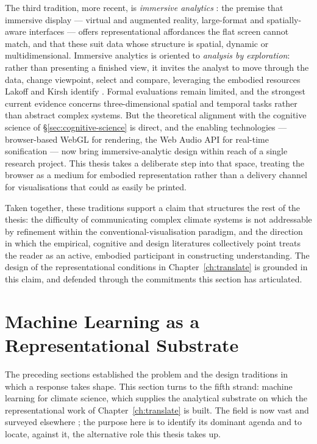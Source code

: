 The third tradition, more recent, is \emph{immersive analytics} \citep{marriott2018}: the premise that immersive display --- virtual and augmented reality, large-format and spatially-aware interfaces --- offers representational affordances the flat screen cannot match, and that these suit data whose structure is spatial, dynamic or multidimensional. Immersive analytics is oriented to \emph{analysis by exploration}: rather than presenting a finished view, it invites the analyst to move through the data, change viewpoint, select and compare, leveraging the embodied resources Lakoff and Kirsh identify \citep{chandler2015}. Formal evaluations remain limited, and the strongest current evidence concerns three-dimensional spatial and temporal tasks rather than abstract complex systems. But the theoretical alignment with the cognitive science of §\ref{sec:cognitive-science} is direct, and the enabling technologies --- browser-based WebGL for rendering, the Web Audio API for real-time sonification --- now bring immersive-analytic design within reach of a single research project. This thesis takes a deliberate step into that space, treating the browser as a medium for embodied representation rather than a delivery channel for visualisations that could as easily be printed.

Taken together, these traditions support a claim that structures the rest of the thesis: the difficulty of communicating complex climate systems is not addressable by refinement within the conventional-visualisation paradigm, and the direction in which the empirical, cognitive and design literatures collectively point treats the reader as an active, embodied participant in constructing understanding. The design of the representational conditions in Chapter~\ref{ch:translate} is grounded in this claim, and defended through the commitments this section has articulated.

\section{Machine Learning as a Representational Substrate}
\label{sec:ml-climate}

The preceding sections established the problem and the design traditions in which a response takes shape. This section turns to the fifth strand: machine learning for climate science, which supplies the analytical substrate on which the representational work of Chapter~\ref{ch:translate} is built. The field is now vast and surveyed elsewhere \citep{reichstein2019, sonnewald2021, irrgang2021}; the purpose here is to identify its dominant agenda and to locate, against it, the alternative role this thesis takes up.


